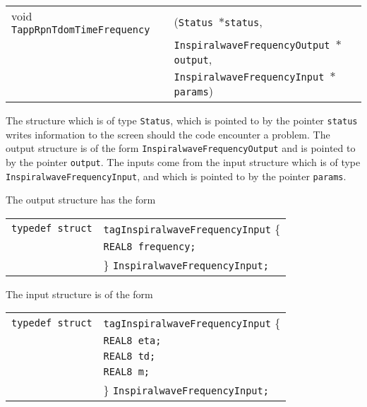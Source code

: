 \documentclass[12pt]{article}
\begin{document}
\vspace{5mm}

\begin{tabular}{ll}
void \texttt{TappRpnTdomTimeFrequency}&(\texttt{Status $\ast$status},     \\
                                   &\texttt{InspiralwaveFrequencyOutput $\ast$output}, \\
                                   &\texttt{InspiralwaveFrequencyInput $\ast$params})
\end{tabular}

\vspace{5mm}

The structure which is of type \texttt{Status}, which is pointed to by the pointer \texttt{status} writes information to the screen should the code encounter a problem. The output structure is of the form \texttt{InspiralwaveFrequencyOutput} and is pointed to by the pointer \texttt{output}.
The inputs come from the input structure which is of type \texttt{InspiralwaveFrequencyInput}, and which is pointed to by the pointer \texttt{params}.

The output structure has the form

\vspace{5mm}

\begin{tabular}{ll}
\texttt{typedef struct} & \texttt{tagInspiralwaveFrequencyInput} \{ \\
                        & \texttt{REAL8 frequency;} \\
                        & \} \texttt{InspiralwaveFrequencyInput;}
\end{tabular}

\vspace{5mm}

The input structure is of the form

\vspace{5mm}

\begin{tabular}{ll}
\texttt{typedef struct} & \texttt{tagInspiralwaveFrequencyInput} \{ \\
                        & \texttt{REAL8 eta;} \\
                        & \texttt{REAL8 td;}  \\
                        & \texttt{REAL8 m;}  \\
                        & \} \texttt{InspiralwaveFrequencyInput;}
\end{tabular}
\end{document}
